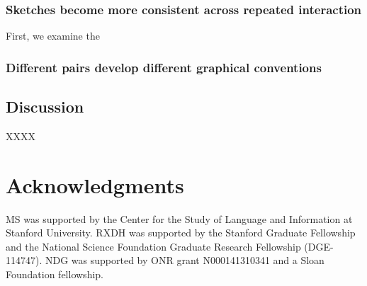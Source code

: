 \documentclass[10pt,letterpaper]{article}
\begin{document}
\subsubsection{Sketches become more consistent across repeated interaction}

First, we examine the 

\subsubsection{Different pairs develop different graphical conventions} 


\subsection{Discussion}

XXXX

\section{\bf Acknowledgments}
\small
MS was supported by the Center for the Study of Language and Information at Stanford University. RXDH was supported by the Stanford Graduate Fellowship and the National Science Foundation Graduate Research Fellowship (DGE-114747). NDG was supported by ONR grant N000141310341 and a Sloan Foundation fellowship.


\setlength{\bibleftmargin}{.125in}
\setlength{\bibindent}{-\bibleftmargin}


\end{document}
